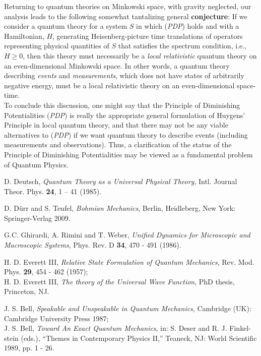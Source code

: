 \documentclass[12pt]{article}
\begin{document}
{Returning to quantum theories on Minkowski space, with gravity neglected, our analysis leads to the following somewhat
tantalizing general {\bf{conjecture}}:
If we consider a quantum theory for a system $S$ in which (\textit{PDP}) holds and with a Hamiltonian,
$H$, generating Heisenberg-picture time translations of operators representing physical quantities of $S$
that satisfies the spectrum condition, i.e., $H\geq 0$, then this theory must necessarily be a  \textit{local relativistic}
quantum theory on an even-dimensional Minkowski space. In other words, a quantum theory describing \textit{events}
and \textit{measurements}, which does not have states of arbitrarily negative energy, must be a local relativistic theory
on an even-dimensional space-time.\\

To conclude this discussion, one might say that the Principle of Diminishing Potentialities (\textit{PDP}) is really the appropriate
general formulation of Huygens' Principle in local quantum theory, and that there may not be any viable alternatives to (\textit{PDP}) if we
want quantum theory to describe events (including measurements and observations). Thus, a clarification of the status of the Principle of Diminishing Potentialities may be viewed as a fundamental problem of Quantum Physics.




\begin{thebibliography}{}

 D. Deutsch, \textit{Quantum Theory as a Universal Physical Theory}, Intl. Journal Theor. Phys. {\bf{24}}, 1 -- 41 (1985).

 D. D\"urr and S. Teufel, \textit{Bohmian Mechanics}, Berlin, Heidleberg, New York: Springer-Verlag 2009.

 G.C. Ghirardi, A. Rimini and T. Weber, \textit{Unified Dynamics for Microscopic and Macroscopic Systems}, Phys. Rev. D {\bf{34}}, 470 - 491 (1986).

 H. D. Everett III, \textit{Relative  State  Formulation  of  Quantum  Mechanics}, Rev. Mod. Phys. {\bf{29}},
454 - 462 (1957); \\
H. D. Everett III, \textit{The theory of the Universal Wave Function}, PhD thesis, Princeton, NJ.

 J. S. Bell, \textit{Speakable and Unspeakable in Quantum Mechanics}, Cambridge (UK):
Cambridge University Press 1987; \\
J. S. Bell, \textit{Toward An Exact Quantum  Mechanics}, in: S. Deser and R. J. Finkel-stein (eds.), ``Themes in Contemporary Physics II,'' Teaneck, NJ: World Scientific 1989, pp. 1 - 26.


\end{thebibliography}}
\end{document}

